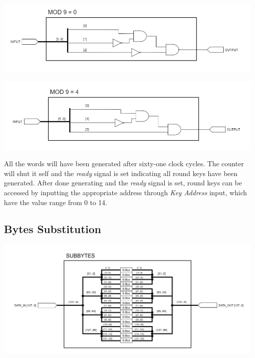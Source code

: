 \documentclass[a4paper, 10pt]{article}
\newenvironment{Figure}
    {\par\medskip\noindent\minipage{\linewidth}}
    {\endminipage\par\medskip}
\begin{document}
\begin{multicols}{2}
            \noindent
            \begin{Figure}
                \centering
                \includegraphics[width=\linewidth]{Mod9Eq0.png}
                \label{fig:mod9eq0}
            \end{Figure}

            \noindent
            \begin{Figure}
                \centering
                \includegraphics[width=\linewidth]{Mod9Eq4.png}
                \label{fig:mod9eq4}
            \end{Figure}

            All the words will have been generated after sixty-one clock cycles. The counter will shut it self and the \textit{ready} signal is set indicating all round keys have been generated. After done generating and the \textit{ready} signal is set, round keys can be accessed by inputting the appropriate address through \textit{Key Address} input, which have the value range from 0 to 14.

            \subsection{Bytes Substitution}

            \noindent
            \begin{Figure}
                \centering
                \includegraphics[width=\linewidth]{SubBytes.png}
                \label{fig:subbytes}
            \end{Figure}


\end{multicols}
\end{document}
